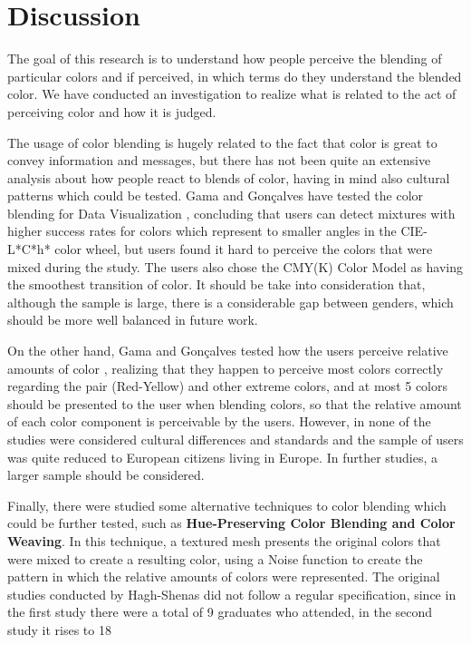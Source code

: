 \section{Discussion}
\label{sec:background_discussion}
%
The goal of this research is to understand how people perceive the blending of particular colors and if perceived,
in which terms do they understand the blended color. We have conducted an investigation to realize what is related to
the act of perceiving color and how it is judged.  \par
The usage of color blending is hugely related to the fact that color is great to convey information and messages,
but there has not been quite an extensive analysis about how people react to blends of color, having in mind also
cultural patterns which could be tested. Gama and Gonçalves have tested the color blending for Data Visualization \cite{Gama20141},
concluding that users can detect mixtures with higher success rates for colors which represent to smaller angles
in the CIE-L*C*h* color wheel, but users found it hard to perceive the colors that were mixed during the study.
The users also chose the CMY(K) Color Model as having the smoothest transition of color. It should be take into
consideration that, although the sample is large, there is a considerable gap between genders, which should be
more well balanced in future work. \par
On the other hand, Gama and Gonçalves tested how the users perceive relative amounts of color \cite{Gama20142}, realizing that they happen to perceive most
colors correctly regarding the pair (Red-Yellow) and other extreme colors, and at most 5 colors should be presented
to the user when blending colors, so that the relative amount of each color component is perceivable by the users.
However, in none of the studies were considered cultural differences and standards and the sample of users was
quite reduced to European citizens living in Europe. In further studies, a larger sample should be
considered. \par
Finally, there were studied some alternative techniques to color blending which could be further tested, such
as \textbf{Hue-Preserving Color Blending and Color Weaving}. In this technique, a textured mesh presents the original
colors that were mixed to create a resulting color, using a Noise function to create the pattern in which the
relative amounts of colors were represented. The original studies conducted by Hagh-Shenas \cite{Hagh-Shenas2007} did not follow a
regular specification,
since in the first study there were a total of 9 graduates who attended, in the second study it rises to 18
